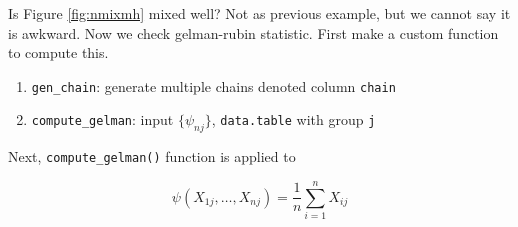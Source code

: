 \documentclass[]{book}
\newenvironment{Shaded}{\begin{snugshade}}{\end{snugshade}}
\newcommand{\CommentTok}[1]{\textcolor[rgb]{0.56,0.35,0.01}{\textit{#1}}}
\newcommand{\ControlFlowTok}[1]{\textcolor[rgb]{0.13,0.29,0.53}{\textbf{#1}}}
\newcommand{\DataTypeTok}[1]{\textcolor[rgb]{0.13,0.29,0.53}{#1}}
\newcommand{\DecValTok}[1]{\textcolor[rgb]{0.00,0.00,0.81}{#1}}
\newcommand{\FloatTok}[1]{\textcolor[rgb]{0.00,0.00,0.81}{#1}}
\newcommand{\KeywordTok}[1]{\textcolor[rgb]{0.13,0.29,0.53}{\textbf{#1}}}
\newcommand{\NormalTok}[1]{#1}
\newcommand{\OperatorTok}[1]{\textcolor[rgb]{0.81,0.36,0.00}{\textbf{#1}}}
\newcommand{\StringTok}[1]{\textcolor[rgb]{0.31,0.60,0.02}{#1}}
\providecommand{\tightlist}{%
  \setlength{\itemsep}{0pt}\setlength{\parskip}{0pt}}
\theoremstyle{definition}
\theoremstyle{definition}
\theoremstyle{definition}
\theoremstyle{remark}
\begin{document}
Is Figure \ref{fig:nmixmh} mixed well? Not as previous example, but we cannot say it is awkward. Now we check gelman-rubin statistic. First make a custom function to compute this.

\begin{enumerate}
\def\labelenumi{\arabic{enumi}.}
\tightlist
\item
  \texttt{gen\_chain}: generate multiple chains denoted column \texttt{chain}
\item
  \texttt{compute\_gelman}: input \(\{ \psi_{nj} \}\), \texttt{data.table} with group \texttt{j}
\end{enumerate}

\begin{Shaded}
\end{Shaded}

Next, \texttt{compute\_gelman()} function is applied to

\[\psi(X_{1j}, \ldots, X_{nj}) = \frac{1}{n} \sum_{i = 1}^n X_{ij}\]
\end{document}

